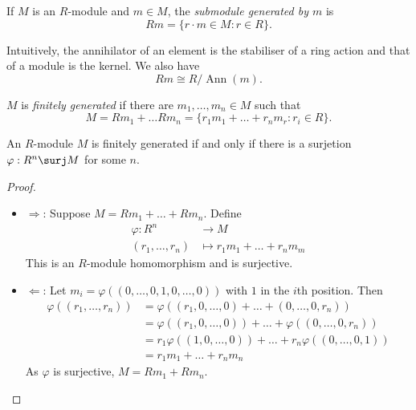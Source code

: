 \documentclass[a4paper]{article}
\theoremstyle{definition}
\DeclareMathOperator{\Ann}{Ann}
\begin{document}
\begin{definition}
  If \(M\) is an \(R\)-module and \(m \in M\), the \emph{submodule generated by \(m\)} is
  \[
    Rm = \{r \cdot m \in M: r \in R\}.
  \]
\end{definition}

\begin{note}
  Intuitively, the annihilator of an element is the stabiliser of a ring action and that of a module is the kernel. We also have
  \[
    Rm \cong R/\Ann(m).
  \]
\end{note}

\begin{definition}
  \(M\) is \emph{finitely generated} if there are \(m_1, \dots, m_n \in M\) such that
  \[
    M = Rm_1 + \dots Rm_n = \{r_1m_1 + \dots + r_nm_r: r_i \in R\}.
  \]
\end{definition}

\begin{lemma}
  An \(R\)-module \(M\) is finitely generated if and only if there is a surjetion \(\varphi: R^n \surj M\) for some \(n\).
\end{lemma}

\begin{proof}\leavevmode
  \begin{itemize}
  \item \(\Rightarrow\): Suppose \(M = Rm_1 + \dots + Rm_n\). Define
    \begin{align*}
      \varphi: R^n &\to M \\
      (r_1, \dots, r_n) &\mapsto r_1m_1 + \dots + r_nm_m
    \end{align*}
    This is an \(R\)-module homomorphism and is surjective.
  \item \(\Leftarrow\): Let \(m_i = \varphi((0, \dots, 0, 1, 0, \dots, 0))\) with \(1\) in the \(i\)th position. Then
    \begin{align*}
      \varphi((r_1, \dots, r_n)) &= \varphi((r_1, 0, \dots, 0) + \dots + (0, \dots, 0, r_n)) \\
                                 &= \varphi((r_1, 0, \dots, 0)) + \dots + \varphi((0, \dots, 0, r_n)) \\
                                 &= r_1 \varphi((1, 0, \dots, 0)) + \dots + r_n \varphi((0, \dots, 0, 1)) \\
      &= r_1m_1 + \dots + r_nm_n
    \end{align*}
    As \(\varphi\) is surjective, \(M = Rm_1 + Rm_n\).
  \end{itemize}
\end{proof}
\end{document}

